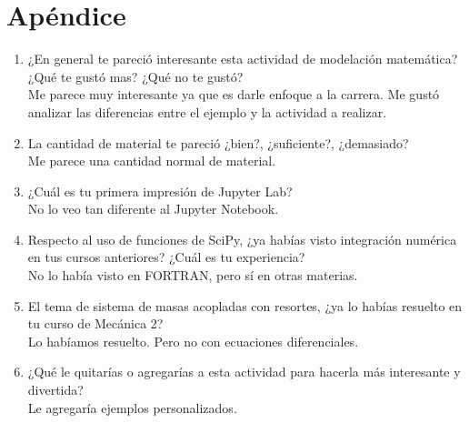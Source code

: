 \documentclass{article}
\begin{document}
\section{Apéndice}
\begin{enumerate}
\item ¿En general te pareció interesante esta actividad de modelación matemática? ¿Qué te gustó mas? ¿Qué no te gustó?
\\Me parece muy interesante ya que es darle enfoque a la carrera. Me gustó analizar las diferencias entre el ejemplo y la actividad a realizar. 
\item La cantidad de material te pareció ¿bien?, ¿suficiente?, ¿demasiado?
\\Me parece una cantidad normal de material.
\item ¿Cuál es tu primera impresión de Jupyter Lab? 
\\No lo veo tan diferente al Jupyter Notebook.
\item Respecto al uso de funciones de SciPy, ¿ya habías visto integración numérica en tus cursos anteriores? ¿Cuál es tu experiencia?
\\No lo había visto en FORTRAN, pero sí en otras materias.
\item El tema de sistema de masas acopladas con resortes, ¿ya lo habías resuelto en tu curso de Mecánica 2? 
\\Lo habíamos resuelto. Pero no con ecuaciones diferenciales.
\item ¿Qué le quitarías o agregarías a esta actividad para hacerla más interesante y divertida? 
\\Le agregaría ejemplos personalizados. 
\end{enumerate}
\end{document}
